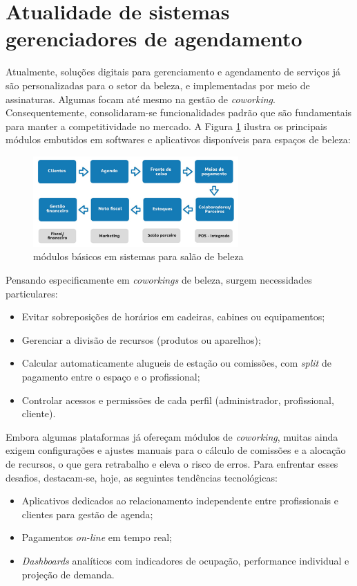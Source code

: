 \section{Atualidade de sistemas gerenciadores de agendamento}

Atualmente, soluções digitais para gerenciamento e agendamento de serviços já são personalizadas para o setor da beleza, e implementadas por meio de assinaturas. Algumas focam até mesmo na gestão de \emph{coworking}. Consequentemente, consolidaram-se funcionalidades padrão que são fundamentais para manter a competitividade no mercado. A Figura \ref{fig:modulos} ilustra os principais módulos embutidos em softwares e aplicativos disponíveis para espaços de beleza:

\begin{figure}[htb]
	\centering
	\includegraphics[width=0.7\textwidth]{cap02-revisao/Images/modulos_basicos_sistema}
	\caption{módulos básicos em sistemas para salão de beleza}
	\label{fig:modulos}
\end{figure}


Pensando especificamente em \emph{coworkings} de beleza, surgem necessidades particulares:
\begin{itemize}
	\item Evitar sobreposições de horários em cadeiras, cabines ou equipamentos;
	\item Gerenciar a divisão de recursos (produtos ou aparelhos);
	\item Calcular automaticamente alugueis de estação ou comissões, com \emph{split} de pagamento entre o espaço e o profissional;
	\item Controlar acessos e permissões de cada perfil (administrador, profissional, cliente).
\end{itemize}

Embora algumas plataformas já ofereçam módulos de \emph{coworking}, muitas ainda exigem configurações e ajustes manuais para o cálculo de comissões e a alocação de recursos, o que gera retrabalho e eleva o risco de erros. Para enfrentar esses desafios, destacam-se, hoje, as seguintes tendências tecnológicas:
\begin{itemize}
	\item Aplicativos dedicados ao relacionamento independente entre profissionais e clientes para gestão de agenda;
	\item Pagamentos \emph{on-line} em tempo real;
	\item \emph{Dashboards} analíticos com indicadores de ocupação, performance individual e projeção de demanda.
\end{itemize}

